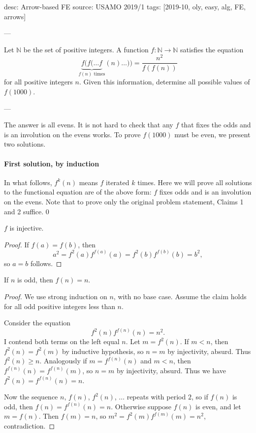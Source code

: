 desc: Arrow-based FE
source: USAMO 2019/1
tags: [2019-10, oly, easy, alg, FE, arrows]

---

Let $\mathbb N$ be the set of positive integers. A function $f:\mathbb N\to\mathbb N$ satisfies the equation \[\underbrace{f(f(\ldots f}_{f(n)\text{ times}}(n)\ldots))=\frac{n^2}{f(f(n))}\]
for all positive integers $n$. Given this information, determine all possible values of $f(1000)$.

---

The answer is all evens. It is not hard to check that any $f$ that fixes the odds and is an involution on the evens works. To prove $f(1000)$ must be even, we present two solutions.

\paragraph{First solution, by induction} In what follows, $f^k(n)$ means $f$ iterated $k$ times. Here we will prove all solutions to the functional equation are of the above form: $f$ fixes odds and is an involution on the evens. Note that to prove only the original problem statement, Claims 1 and 2 suffice.
\setcounter{claim}0
\begin{claim}
    $f$ is injective.
\end{claim}
\begin{proof}
    If $f(a)=f(b)$, then \[a^2=f^2(a)f^{f(a)}(a)=f^2(b)f^{f(b)}(b)=b^2,\]
    so $a=b$ follows.
\end{proof}
\begin{claim}
    If $n$ is odd, then $f(n)=n$.
\end{claim}
\begin{proof}
    We use strong induction on $n$, with no base case. Assume the claim holds for all odd positive integers less than $n$.

    Consider the equation \[f^2(n)f^{f(n)}(n)=n^2.\]
    I contend both terms on the left equal $n$. Let $m=f^2(n)$. If $m<n$, then $f^2(n)=f^2(m)$ by inductive hypothesis, so $n=m$ by injectivity, absurd. Thus $f^2(n)\ge n$. Analogously if $m=f^{f(n)}(n)$ and $m<n$, then $f^{f(n)}(n)=f^{f(n)}(m)$, so $n=m$ by injectivity, absurd. Thus we have $f^2(n)=f^{f(n)}(n)=n$.

    Now the sequence $n$, $f(n)$, $f^2(n)$, $\ldots$ repeats with period $2$, so if $f(n)$ is odd, then $f(n)=f^{f(n)}(n)=n$. Otherwise suppose $f(n)$ is even, and let $m=f(n)$. Then $f(m)=n$, so $m^2=f^2(m)f^{f(m)}(m)=n^2$, contradiction.
\end{proof}
